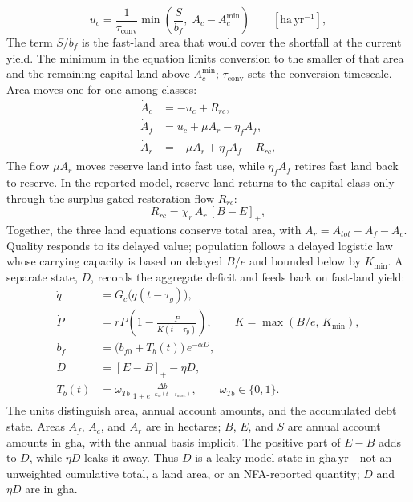 \documentclass[preprint,12pt,authoryear]{elsarticle}
\newcommand{\pos}[1]{\left[#1\right]_+}
\newcommand{\Acmin}{A_c^{\min}}
\newcommand{\tconv}{\tau_{\mathrm{conv}}}
\begin{document}
\begin{equation}\label{eq:uc}u_c=\frac{1}{\tconv}\min\!\left(\frac{S}{b_f},\;A_c-\Acmin\right)\qquad[\mathrm{ha\,yr^{-1}}],
\end{equation}
The term $S/b_f$ is the fast-land area that would cover the shortfall at the current yield. The minimum in the equation limits conversion to the smaller of that area and the remaining capital land above $\Acmin$; $\tconv$ sets the conversion timescale. Area moves one-for-one among classes:
\begin{align}
\dot A_c&=-u_c+R_{rc},\label{eq:Ac}\\
\dot A_f&=u_c+\mu A_r-\eta_f A_f,\label{eq:Af}\\
\dot A_r&=-\mu A_r+\eta_f A_f-R_{rc},\label{eq:Ar}
\end{align}
The flow $\mu A_r$ moves reserve land into fast use, while $\eta_f A_f$ retires fast land back to reserve. In the reported model, reserve land returns to the capital class only through the surplus-gated restoration flow $R_{rc}$:
\begin{equation}\label{eq:Rrc}
R_{rc}=\chi_r\,A_r\,\pos{B-E},
\end{equation}
Together, the three land equations conserve total area, with $A_r=A_{tot}-A_f-A_c$. Quality responds to its delayed value; population follows a delayed logistic law \citep{Pearl1925,Hutchinson1948} whose carrying capacity is based on delayed $B/e$ and bounded below by $K_{\min}$. A separate state, $D$, records the aggregate deficit and feeds back on fast-land yield:
\begin{align}
\dot q&=G_c\big(q(t-\tau_g)\big),\label{eq:q}\\
\dot P&=rP\left(1-\frac{P}{K(t-\tau_p)}\right),\qquad K=\max(B/e,\,K_{\min}),\label{eq:P}\\
b_f&=\big(b_{f0}+T_b(t)\big)\,e^{-\alpha D},\label{eq:bf}\\
\dot D&=\pos{E-B}-\eta D,\label{eq:D}\\
T_b(t)&=\omega_{Tb}\,\frac{\Delta b}{1+e^{-\kappa_w(t-t_{wave})}},\qquad \omega_{Tb}\in\{0,1\}.\label{eq:Tb}
\end{align}
The units distinguish area, annual account amounts, and the accumulated debt state. Areas $A_f$, $A_c$, and $A_r$ are in hectares; $B$, $E$, and $S$ are annual account amounts in gha, with the annual basis implicit. The positive part of $E-B$ adds to $D$, while $\eta D$ leaks it away. Thus $D$ is a leaky model state in gha\,yr—not an unweighted cumulative total, a land area, or an NFA-reported quantity; $\dot D$ and $\eta D$ are in gha.
\end{document}
